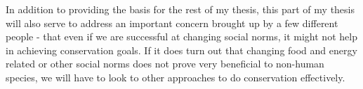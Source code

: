 \documentclass[rutwik_proposal.tex]{subfiles}
\begin{document}
In addition to providing the basis for the rest of my thesis, this part of my thesis will also serve to address an important concern brought up by a few different people - that even if we are successful at changing social norms, it might not help in achieving conservation goals. If it does turn out that changing food and energy related or other social norms does not prove very beneficial to non-human species, we will have to look to other approaches to do conservation effectively.
\end{document}
